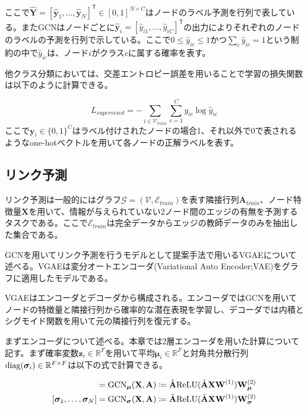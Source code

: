 ここで$\hat{\mathbf{Y}} = [\hat{\boldsymbol{y}}_1, \dots, \hat{\boldsymbol{y}}_N]^{\mathsf{T}} \in [0, 1]^{N \times C}$はノードのラベル予測を行列で表している。またGCNはノードごとに$\hat{\boldsymbol{y}}_i = [\hat{y}_{i1}, \dots, \hat{y}_{iC}]^{\mathsf{T}}$の出力によりそれぞれのノードのラベルの予測を行列で示している。ここで$0 \leq \hat{y}_{ic} \leq 1$かつ$\sum_c \hat{y}_{ic} = 1$という制約の中で$\hat{y}_{ic}$は、ノード$i$がクラス$c$に属する確率を表す。


他クラス分類においては、交差エントロピー誤差を用いることで学習の損失関数は以下のように計算できる。

\begin{equation}
L_{supervised} = - \sum_{i \in \mathcal{V}_{train}} \sum_{c=1}^C y_{ic} \log \hat{y}_{ic}
\end{equation}
ここで$\boldsymbol{y}_i \in \{0,1\}^C$はラベル付けされたノードの場合1、それ以外で0で表されるようなone-hotベクトルを用いて各ノードの正解ラベルを表す。

\subsection{リンク予測}
リンク予測は一般的にはグラフ$\mathcal{G} = (\mathcal{V}, \mathcal{E}_{train})$を表す隣接行列$\mathbf{A}_{train}$、ノード特徴量$\mathbf{X}$を用いて、情報が与えられていない2ノード間のエッジの有無を予測するタスクである。ここで$\mathcal{E}_{train}$は完全データからエッジの教師データのみを抽出した集合である。

GCNを用いてリンク予測を行うモデルとして提案手法で用いるVGAE\cite{kipf2016variational}について述べる。VGAEは変分オートエンコーダ(Variational Auto Encoder;VAE)\cite{kingma2013auto}をグラフに適用したモデルである。

VGAEはエンコーダとデコーダから構成される。エンコーダではGCNを用いてノードの特徴量と隣接行列から確率的な潜在表現を学習し、デコーダでは内積とシグモイド関数を用いて元の隣接行列を復元する。

まずエンコーダについて述べる。本章では2層エンコーダを用いた計算について記す。まず確率変数$\boldsymbol{z}_i \in \mathbb{R}^{F}$を用いて平均$\boldsymbol{\mu}_i \in \mathbb{R}^{F}$と対角共分散行列$\mathrm{diag}(\boldsymbol{\sigma}_i) \in \mathbb{R}^{F \times F}$は以下の式で計算できる。

\begin{align}
    [\boldsymbol{\mu}_1, \dots, \boldsymbol{\mu}_N] &= \mathrm{GCN}_{\boldsymbol{\mu}}(\mathbf{X}, \mathbf{A}) \coloneqq \hat{\mathbf{A}} \relu (\hat{\mathbf{A}} \mathbf{X} \mathbf{W}^{(1)})\mathbf{W}_{\boldsymbol{\mu}}^{(2)} \label{eq:vgae_encoder_mu}\\
    [\boldsymbol{\sigma}_1, \dots, \boldsymbol{\sigma}_N] &= \mathrm{GCN}_{\boldsymbol{\sigma}}(\mathbf{X}, \mathbf{A}) \coloneqq \hat{\mathbf{A}} \relu (\hat{\mathbf{A}} \mathbf{X} \mathbf{W}^{(1)})\mathbf{W}_{\boldsymbol{\sigma}}^{(2)} \label{eq:vgae_encoder_sigma}
\end{align}

